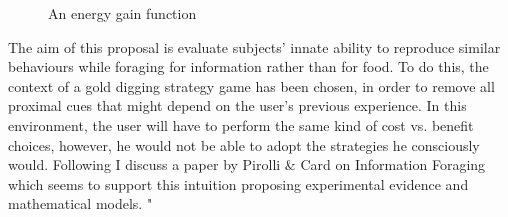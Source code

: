 \documentclass{mproj}
\begin{document}
\begin{figure} [!ht] 
	\centering
	\caption{An energy gain function}
           \label{gain1}
\end{figure}

The aim of this proposal is evaluate subjects' innate ability to reproduce similar behaviours while foraging for information rather than for food. To do this, the context of a gold digging strategy game has been chosen, in order to remove all proximal cues that might depend on the user's previous experience. In this environment, the user will have to perform the same kind of cost vs. benefit choices, however, he would not be able to adopt the strategies he consciously would. Following I discuss a paper by Pirolli \& Card on Information Foraging which seems to support this intuition proposing experimental evidence and mathematical models.  "
\end{document}
